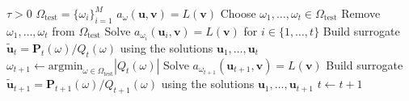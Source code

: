 \begin{algorithmic}
    \Require $\tau > 0$ 
    \Require $\Omega_{\mathrm{test}} = \{\omega_i\}_{i=1}^M$ 
    \Require $a_{\omega}(\mathbf{u}, \mathbf{v}) = L(\mathbf{v})$ 
    \State Choose $\omega_1, \dots, \omega_t \in \Omega_{\mathrm{test}}$ 
    \State Remove $\omega_1, \dots, \omega_t$ from $\Omega_{\mathrm{test}}$
    \State Solve $a_{\omega_i}(\mathbf{u}_i, \mathbf{v}) = L(\mathbf{v})$ for $i \in \{1, \dots, t\}$
    \State Build surrogate $\mathbf{\tilde{u}}_t = \mathbf{P}_t(\omega) / Q_t(\omega)$ using the solutions $\mathbf{u}_1, \dots, \mathbf{u}_t$
        \State $\omega_{t+1} \leftarrow \textrm{argmin}_{\omega \in \Omega_{\mathrm{test}}} |Q_t(\omega)|$
        \State Solve $a_{\omega_{t+1}}(\mathbf{u}_{t+1}, \mathbf{v}) = L(\mathbf{v})$
        \State Build surrogate $\mathbf{\tilde{u}}_{t+1} = \mathbf{P}_{t+1}(\omega) / Q_{t+1}(\omega)$ using the solutions $\mathbf{u}_1, \dots, \mathbf{u}_{t+1}$
            \Return
        \EndIf
        \State $t \leftarrow t+1$
    \EndWhile
\end{algorithmic}